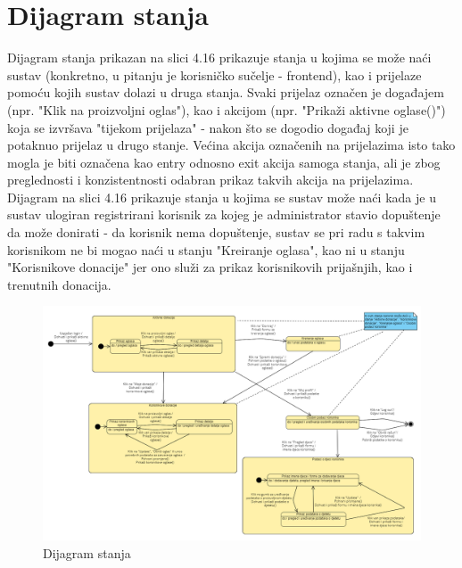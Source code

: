 			\eject
		
		\section{Dijagram stanja}
			
                Dijagram stanja prikazan na slici 4.16 prikazuje stanja u kojima se može naći sustav (konkretno, u pitanju je korisničko sučelje - frontend), kao i prijelaze pomoću kojih sustav dolazi u druga stanja. Svaki prijelaz označen je događajem (npr. "Klik na proizvoljni oglas"), kao i akcijom (npr. "Prikaži aktivne oglase()") koja se izvršava "tijekom prijelaza" - nakon što se dogodio događaj koji je potaknuo prijelaz u drugo stanje. Većina akcija označenih na prijelazima isto tako mogla je biti označena kao entry odnosno exit akcija samoga stanja, ali je zbog preglednosti i konzistentnosti odabran prikaz takvih akcija na prijelazima. Dijagram na slici 4.16 prikazuje stanja u kojima se sustav može naći kada je u sustav ulogiran registrirani korisnik za kojeg je administrator stavio dopuštenje da može donirati - da korisnik nema dopuštenje, sustav se pri radu s takvim korisnikom ne bi mogao naći u stanju "Kreiranje oglasa", kao ni u stanju "Korisnikove donacije" jer ono služi za prikaz korisnikovih prijašnjih, kao i trenutnih donacija. \\

                \begin{figure}[H]
				\includegraphics[width=\textwidth,height=0.45\textheight]{dijagrami/Dijagram stanja.png}
				\centering
				\caption{Dijagram stanja}
				\label{fig:StateDiagram}
			\end{figure}
			
			\eject 
                
